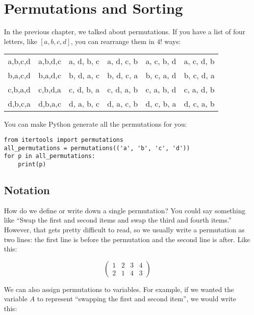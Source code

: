 \chapter{Permutations and Sorting}

In the previous chapter, we talked about permutations. If you have a list
of four letters, like $[a, b, c, d]$, you can rearrange them in $4!$
ways:

\begin{tabular}{c c c c c c}
  a,b,c,d & a,b,d,c & a, d, b, c & a, d, c, b & a, c, b, d & a, c, d, b \\
  b,a,c,d & b,a,d,c & b, d, a, c & b, d, c, a & b, c, a, d & b, c, d, a \\
  c,b,a,d & c,b,d,a & c, d, b, a & c, d, a, b & c, a, b, d & c, a, d, b \\
  d,b,c,a & d,b,a,c & d, a, b, c & d, a, c, b & d, c, b, a & d, c, a, b
\end{tabular}

You can make Python generate all the permutations for you:

\begin{Verbatim}
from itertools import permutations
all_permutations = permutations(('a', 'b', 'c', 'd'))
for p in all_permutations:
    print(p)
\end{Verbatim}

\section{Notation}

How do we define or write down a single permutation? You could say
something like ``Swap the first and second items and swap the third
and fourth items.'' However, that gets pretty difficult to read, so we
usually write a permutation as two lines: the first line is before
the permutation and the second line is after.  Like this:

$$\begin{pmatrix}
  1 & 2 & 3 & 4 \\
  2 & 1 & 4 & 3
\end{pmatrix}$$

We can also assign permutations to variables. For example, if we wanted the
variable $A$ to represent ``swapping the first and second item'', we
would write this:

